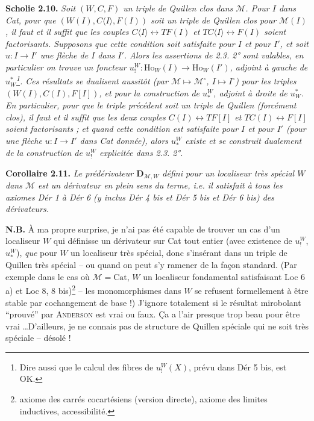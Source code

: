 \documentclass[11pt]{article}
\newcommand{\printedpage}[1]{\marginpar{\footnotesize p.~#1}}
\newcommand{\msp}[1]{\marginpar{\footnotesize [#1]}}
\newcommand{\M}{\mathcal{M}}
\newcommand{\Cat}{\mathrm{Cat}}
\newcommand{\Ho}{\mathrm{Ho}}
\begin{document}
\printedpage{19}

\msp{page 31}
\textbf{Scholie 2.10.} \textit{Soit $(W,C,F)$ un triple de Quillen clos dans $\M$. Pour $I$ dans \textup{Cat}, pour que $(W(I),C\langle I\rangle,F(I))$ soit un triple de Quillen clos pour $\M(I)$, il faut et il suffit que les couples $C\langle I\rangle\longleftrightarrow TF(I)$ et $TC\langle I\rangle\longleftrightarrow F(I)$ soient factorisants. Supposons que cette condition soit satisfaite pour $I$ et pour $I'$, et soit $u : I\longrightarrow I'$ une flèche de $I$ dans $I'$. Alors les assertions de \textup{2.3. 2°} sont valables, en particulier on trouve un foncteur $u^{W}_{!} : \Ho_W(I)\longrightarrow\Ho_W(I')$, adjoint à gauche de $u^{*}_{W}$\footnote[18]{Dire aussi que le calcul des fibres de $u^{W}_{!}(X)$, prévu dans Dér 5 bis, est OK.}. Ces résultats se dualisent aussitôt (par $\M\longmapsto\M^{\circ}$, $I\longmapsto I^{\circ}$) pour les triples $(W(I),C(I),F[I])$, et pour la construction de $u^{W}_{*}$, adjoint à droite de $u^{*}_{W}$. En particulier, pour que le triple précédent soit un triple de Quillen (forcément clos), il faut et il suffit que les deux couples $C(I)\longleftrightarrow TF[I]$ et $TC(I)\longleftrightarrow F[I]$ soient factorisants ; et quand cette condition est satisfaite pour $I$ et pour $I'$ (pour une flèche $u : I\longrightarrow I'$ dans \textup{Cat} donnée), alors $u^{W}_{*}$ existe et se construit dualement de la construction de $u^{W}_{!}$ explicitée dans \textup{2.3. 2°}.}

\msp{page 32}
\textbf{Corollaire 2.11.} \textit{Le prédérivateur $\mathbf{D}_{\M,W}$ défini pour un localiseur \textup{très spécial} $W$ dans $\M$ est un dérivateur en plein sens du terme, i.e. il satisfait à tous les axiomes Dér 1 à Dér 6 (y inclus Dér 4 bis et Dér 5 bis et Dér 6 bis) des dérivateurs.}

\textbf{N.B.} À ma propre surprise, je n'ai pas été capable de trouver un cas d'un localiseur $W$ qui définisse un dérivateur sur Cat tout entier (avec existence de $u^{W}_{!}$, $u^{W}_{*}$), \textit{que} pour $W$ un localiseur très spécial, donc s'insérant dans un triple de Quillen très spécial -- ou quand on peut s'y ramener de la façon standard. (Par exemple dans le cas où $\M=\Cat$, $W$ un localiseur fondamental satisfaisant Loc 6 a) et Loc 8, 8 bis)\footnote[19]{axiome des carrés cocartésiens (version directe), axiome des limites inductives, accessibilité.} -- les monomorphismes dans $W$ se refusent formellement à être stable par cochangement de base !) J'ignore totalement si le résultat mirobolant ``prouvé'' par \textsc{Anderson} est vrai ou faux. Ça a l'air presque trop beau pour être vrai \ldots{}D'ailleurs, je ne connais pas de structure de Quillen spéciale qui ne soit très spéciale -- désolé ! %
\end{document}
